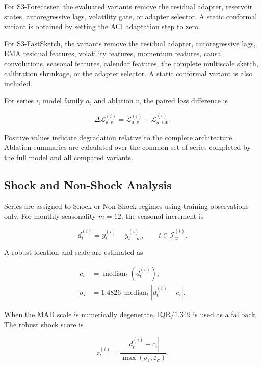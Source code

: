 \documentclass[review,number,sort&compress]{elsarticle}
\begin{document}
For S3-Forecaster, the evaluated variants remove the residual adapter, reservoir states, autoregressive lags, volatility gate, or adapter selector. A static conformal variant is obtained by setting the ACI adaptation step to zero.

For S3-FastSketch, the variants remove the residual adapter, autoregressive lags, EMA residual features, volatility features, momentum features, causal convolutions, seasonal features, calendar features, the complete multiscale sketch, calibration shrinkage, or the adapter selector. A static conformal variant is also included.

For series \(i\), model family \(a\), and ablation \(v\), the paired loss difference is

\begin{equation}
\Delta\mathcal{L}_{a,v}^{(i)}
=
\mathcal{L}_{a,v}^{(i)}
-
\mathcal{L}_{a,\mathrm{full}}^{(i)}.
\label{eq:ablation_delta}
\end{equation}

Positive values indicate degradation relative to the complete architecture. Ablation summaries are calculated over the common set of series completed by the full model and all compared variants.

\subsection{Shock and Non-Shock Analysis}
\label{subsec:shock_analysis}

Series are assigned to Shock or Non-Shock regimes using training observations only. For monthly seasonality \(m=12\), the seasonal increment is

\begin{equation}
d_t^{(i)}
=
y_t^{(i)}-y_{t-m}^{(i)},
\qquad
t\in\mathcal{I}_{\mathrm{tr}}^{(i)}.
\end{equation}

A robust location and scale are estimated as

\begin{align}
c_i
&=
\operatorname{median}_{t}
\left(d_t^{(i)}\right),\\
\sigma_i
&=
1.4826\,
\operatorname{median}_{t}
\left|
d_t^{(i)}-c_i
\right|.
\end{align}

When the MAD scale is numerically degenerate, \(\mathrm{IQR}/1.349\) is used as a fallback. The robust shock score is

\begin{equation}
z_t^{(i)}
=
\frac{
\left|d_t^{(i)}-c_i\right|
}{
\max(\sigma_i,\varepsilon_{\sigma})
}.
\end{equation}
\end{document}
